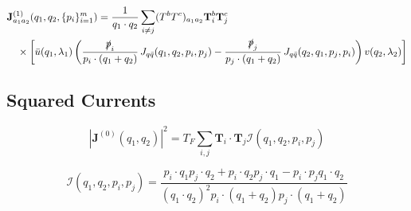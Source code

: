 \documentclass[a4paper,11pt]{article}
\begin{document}
\begin{equation}
\begin{split}
 &\mathbf{J}^{(1)}_{a_1 a_2}(q_1,q_2, \{ p_i \}_{i=1}^m ) =  \frac{1}{q_1 \cdot q_2} \sum_{i\neq j} (T^bT^c)_{a_1a_2} \mathbf{T}^b_i \mathbf{T}^c_j \, \\
  & \quad \times \left[ \bar{u}(q_1,\lambda_1) \left( \frac{\slashed{p}_i}{p_i \cdot (q_1 + q_2)} \, J_{q\bar{q}}(q_1,q_2, p_i, p_j)  - \frac{\slashed{p}_j}{p_j \cdot (q_1 + q_2)} \, J_{q\bar{q}}(q_2,q_1, p_j, p_i) \right) v(q_2,\lambda_2) \right]
\end{split}
\end{equation}

\subsection{Squared Currents}
\begin{equation}
|\mathbf{J}^{(0)}(q_1, q_2)|^2 = T_F \sum_{i, j} \mathbf{T}_i \cdot \mathbf{T}_j \mathcal{I}(q_1, q_2, p_i, p_j)
\end{equation}

\begin{equation}
\mathcal{I}(q_1, q_2, p_i, p_j) = \frac{p_i \cdot q_1 p_j \cdot q_2 + p_i \cdot q_2 p_j \cdot q_1 - p_i \cdot p_j q_1 \cdot q_2}{(q_1 \cdot q_2)^2 p_i \cdot (q_1 + q_2) p_j \cdot (q_1 + q_2)}
\end{equation}
\end{document}
